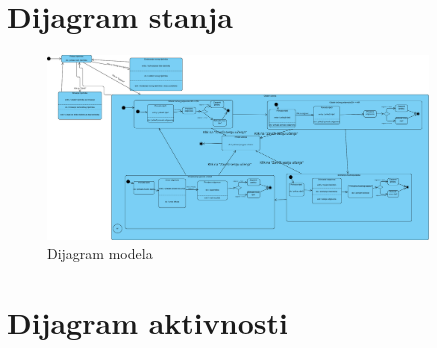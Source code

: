 		
		\section{Dijagram stanja}
			
			
        \begin{figure}[H]
            \includegraphics[width=0.9\textwidth]{dijagrami/Dijagram_stanja.png} 
            \centering
            \caption{Dijagram modela}
            \label{fig:class_diagram}
        \end{figure}			
			
			\eject 
		
		\section{Dijagram aktivnosti}
			

